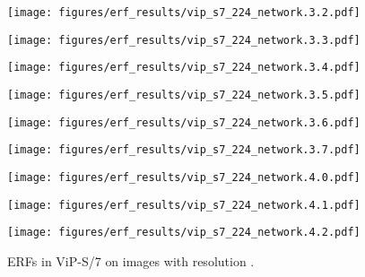 \documentclass{article}
\begin{document}
\begin{figure}[tb]
\begin{minipage}[t]{0.13\hsize}
  \end{minipage}
  \begin{minipage}[t]{0.13\hsize}
    \centering
    \texttt{[image: figures/erf\_results/vip\_s7\_224\_network.3.2.pdf]}
    \label{figure:erf_vip:9}
  \end{minipage}
  \begin{minipage}[t]{0.13\hsize}
    \centering
    \texttt{[image: figures/erf\_results/vip\_s7\_224\_network.3.3.pdf]}
    \label{figure:erf_vip:10}
  \end{minipage}
  \begin{minipage}[t]{0.13\hsize}
    \centering
    \texttt{[image: figures/erf\_results/vip\_s7\_224\_network.3.4.pdf]}
    \label{figure:erf_vip:11}
  \end{minipage}
  \begin{minipage}[t]{0.13\hsize}
    \centering
    \texttt{[image: figures/erf\_results/vip\_s7\_224\_network.3.5.pdf]}
    \label{figure:erf_vip:12}
  \end{minipage}
  \begin{minipage}[t]{0.13\hsize}
    \centering
    \texttt{[image: figures/erf\_results/vip\_s7\_224\_network.3.6.pdf]}
    \label{figure:erf_vip:13}
  \end{minipage}
  \begin{minipage}[t]{0.13\hsize}
    \centering
    \texttt{[image: figures/erf\_results/vip\_s7\_224\_network.3.7.pdf]}
    \label{figure:erf_vip:14}
  \end{minipage}
  \begin{minipage}[t]{0.13\hsize}
    \centering
    \texttt{[image: figures/erf\_results/vip\_s7\_224\_network.4.0.pdf]}
    \label{figure:erf_vip:15}
  \end{minipage}
  \begin{minipage}[t]{0.13\hsize}
    \centering
    \texttt{[image: figures/erf\_results/vip\_s7\_224\_network.4.1.pdf]}
    \label{figure:erf_vip:16}
  \end{minipage}
  \begin{minipage}[t]{0.13\hsize}
    \centering
    \texttt{[image: figures/erf\_results/vip\_s7\_224\_network.4.2.pdf]}
    \label{figure:erf_vip:17}
  \end{minipage}
  \caption{ERFs in ViP-S/7 \cite{hou2022vision} on images with resolution .}
    \label{figure:erf_vip}
\end{figure} 
\end{document}
